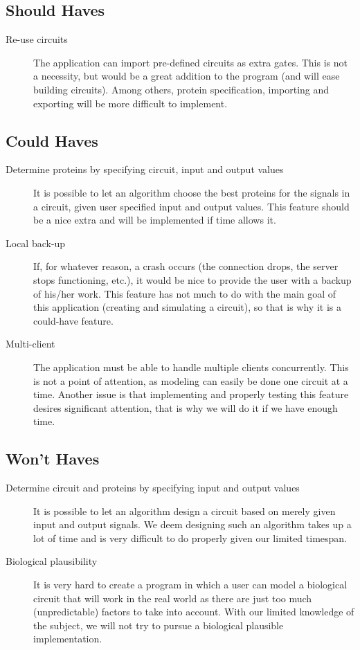 \documentclass[a4paper]{article}
\begin{document}
\subsection{Should Haves}
\begin{description}
\item[Re-use circuits] The application can import pre-defined circuits as extra gates. This is not a necessity, but would be a great addition to the program (and will ease building circuits). Among others, protein specification, importing and exporting will be more difficult to implement.
\end{description}

\subsection{Could Haves}
\begin{description}
\item[Determine proteins by specifying circuit, input and output values] It is possible to let an algorithm choose the best proteins for the signals in a circuit, given user specified input and output values. This feature should be a nice extra and will be implemented if time allows it.
\item[Local back-up] If, for whatever reason, a crash occurs (the connection drops, the server stops functioning, etc.), it would be nice to provide the user with a backup of his/her work. This feature has not much to do with the main goal of this application (creating and simulating a circuit), so that is why it is a could-have feature.
\item[Multi-client] The application must be able to handle multiple clients concurrently. This is not a point of attention, as modeling can easily be done one circuit at a time. Another issue is that implementing and properly testing this feature desires significant attention, that is why we will do it if we have enough time.
\end{description}

\subsection{Won't Haves}
\begin{description}
\item[Determine circuit and proteins by specifying input and output values] It is possible to let an algorithm design a circuit based on merely given input and output signals. We deem designing such an algorithm takes up a lot of time and is very difficult to do properly given our limited timespan.
\item[Biological plausibility] It is very hard to create a program in which a user can model a biological circuit that will work in the real world as there are just too much (unpredictable) factors to take into account. With our limited knowledge of the subject, we will not try to pursue a biological plausible implementation.
\end{description}
\end{document}
